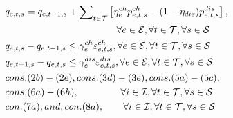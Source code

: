 \documentclass[lettersize,journal]{IEEEtran}
\begin{document}
\begin{subequations}
\begin{align}
		 & q_{e,t,s} = q_{e,t-1,s} + \sum\nolimits_{t\in\mathcal{T}} \left[\eta_{e}^{ch} p_{e,t,s}^{ch} - (1-\eta_{dis}) p_{e,t,s}^{dis}\right],\notag                                                                                               \\
		 & \,\,\,\quad\qquad\qquad\qquad \qquad\qquad \forall e\in\mathcal{E}, \forall t\in\mathcal{T}, \forall s\in\mathcal{S}                                                                                                                      \\
		 & q_{e,t,s} - q_{e,t-1,s} \leq \gamma_{e}^{ch} \varepsilon_{e,t,s}^{ch},\forall e\in\mathcal{E}, \forall t\in\mathcal{T}, \forall s\in\mathcal{S}                                                                                           \\
		 & q_{e,t-1,s} - q_{e,t,s} \leq \gamma_{e}^{dis} \varepsilon_{e,t,s}^{dis},\forall e\in\mathcal{E}, \forall t\in\mathcal{T}, \forall s\in\mathcal{S}                                                                                         \\
		 & cons.(2b)-(2e), cons.(3d)-(3e), cons.(5a)-(5c), \notag                                                                                                                                                                                    \\
		 & cons.(6a)-(6h), \qquad\qquad\,\, \forall i\in\mathcal{I}, \forall t\in\mathcal{T}, \forall s\in\mathcal{S}                                                                                                                                \\
		 & con.(7a), and, con.(8a), \quad\quad \forall i\in\mathcal{I}, \forall t\in\mathcal{T}, \forall s\in\mathcal{S}
	\end{align}
\end{subequations}
\end{document}
